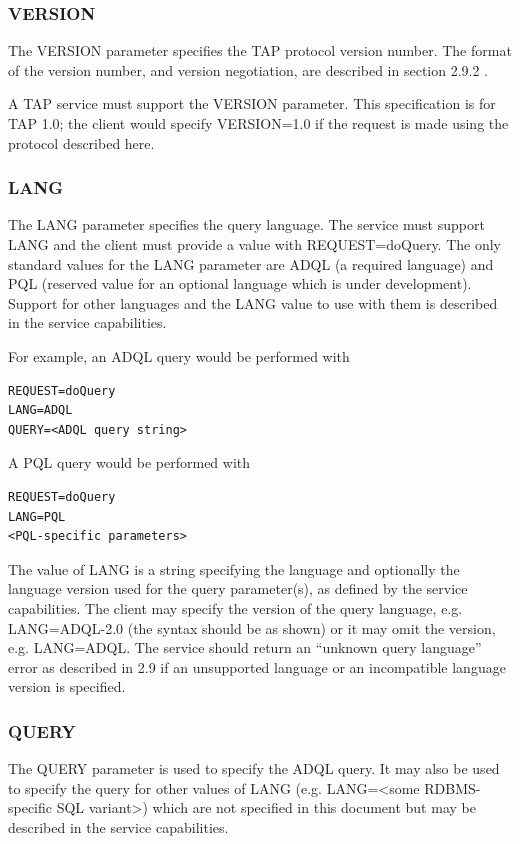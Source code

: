 \documentclass[11pt,a4paper]{ivoa}
\begin{document}
\subsubsection{VERSION}
The VERSION parameter specifies the TAP protocol version number. The format of 
the version number, and version negotiation, are described in section 2.9.2 .

A TAP service must support the VERSION parameter. This specification is for TAP 
1.0; the client would specify VERSION=1.0 if the request is made using the 
protocol described here.

\subsubsection{LANG}
The LANG parameter specifies the query language. The service must support LANG 
and the client must provide a value with REQUEST=doQuery. The only standard 
values for the LANG parameter are ADQL (a required language) and PQL (reserved 
value for an optional language which is under development). Support for other 
languages and the LANG value to use with them is described in the service 
capabilities.

For example, an ADQL query would be performed with
\begin{verbatim}
REQUEST=doQuery
LANG=ADQL
QUERY=<ADQL query string>
\end{verbatim}
A PQL query would be performed with
\begin{verbatim}
REQUEST=doQuery
LANG=PQL
<PQL-specific parameters>
\end{verbatim}
The value of LANG is a string specifying the language and optionally the 
language version used for the query parameter(s), as defined by the service 
capabilities.  The client may specify the version of the query language,  e.g. 
LANG=ADQL-2.0 (the syntax should be as shown) or it may omit the version, e.g. 
LANG=ADQL.  The service should return an “unknown query language” error as 
described in 2.9 if an unsupported language or an incompatible language version 
is specified.

\subsubsection{QUERY}
The QUERY parameter is used to specify the ADQL query. It may also be used to 
specify the query for other values of LANG (e.g. LANG=<some RDBMS-specific SQL 
variant>) which are not specified in this document but may be described in the 
service capabilities.
\end{document}

